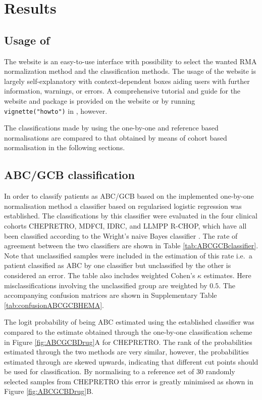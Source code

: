 \documentclass{article}
\begin{document}
\section{Results}
\subsection{Usage of \hemaClass{}}
The website is an easy-to-use interface with possibility to select the wanted RMA normalization method and the classification methods.
The usage of the website is largely self-explanatory with context-dependent boxes aiding users with further information, warnings, or errors.
A comprehensive tutorial and guide for the  website and package is provided on the website or by running \texttt{vignette("howto")} in \R{}, however.

The classifications made by \hemaClass{} using the one-by-one and reference based normalisations are compared to that obtained by means of cohort based normalisation in the following sections.


\subsection{ABC/GCB classification}
In order to classify patients as ABC/GCB based on the implemented one-by-one normalisation method a classifier based on regularised logistic regression was established.
The classifications by this classifier were evaluated in the four clinical cohorts CHEPRETRO, MDFCI, IDRC, and LLMPP R-CHOP, which have all been classified according to the Wright's naive Bayes classifier \citep{Wright2003,Lenz2008a}.
The rate of agreement between the two classifiers are shown in Table \ref{tab:ABCGCBclassifier}.
Note that unclassified samples were included in the estimation of this rate i.e.\ a patient classified as ABC by one classifier but unclassified by the other is considered an error.
The table also includes weighted Cohen's $\kappa$ estimates.
Here misclassifications involving the unclassified group are weighted by $0.5$.
The accompanying confusion matrices are shown in Supplementary Table \ref{tab:confusionABCGCBHEMA}.

The logit probability of being ABC estimated using the established classifier was compared to the estimate obtained through the one-by-one classification scheme in Figure \ref{fig:ABCGCBDrug}A for CHEPRETRO.
The rank of the probabilities estimated through the two methods are very similar, however, the probabilities estimated through \hemaClass{} are skewed upwards, indicating that different cut points should be used for classification.
By normalising to a reference set of $30$ randomly selected samples from CHEPRETRO this error is greatly minimised as shown in Figure \ref{fig:ABCGCBDrug}B.
\end{document}
